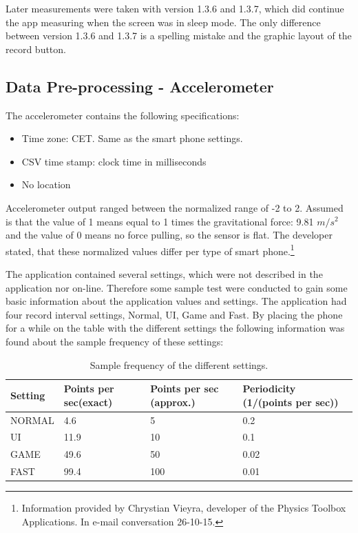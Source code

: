 Later measurements were taken with version 1.3.6 and 1.3.7, which did continue the app measuring when the screen was in sleep mode. The only difference between version 1.3.6 and 1.3.7 is a spelling mistake and the graphic layout of the record button.

\subsection{Data Pre-processing - Accelerometer}
The accelerometer contains the following specifications:
\begin{itemize}
\item Time zone: CET. Same as the smart phone settings. 
\item CSV time stamp: clock time in milliseconds
\item No location
\end{itemize}

Accelerometer output ranged between the normalized range of -2 to 2. Assumed is that the value of 1 means equal to 1 times the gravitational force: 9.81 $m/s^2$ and the value of 0 means no force pulling, so the sensor is flat. The developer stated, that these normalized values differ per type of smart phone.\footnote{Information provided by Chrystian Vieyra, developer of the Physics Toolbox Applications. In e-mail conversation 26-10-15. }

The application contained several settings, which were not described in the application nor on-line. Therefore some sample test were conducted to gain some basic information about the application values and settings. The application had four record interval settings, Normal, UI, Game and Fast. By placing the phone for a while on the table with the different settings the following information was found about the sample frequency of these settings: 

\renewcommand{\arraystretch}{1.5}
\renewcommand{\tabcolsep}{0.2cm}
\begin{table}[h]
\caption{Sample frequency of the different settings.}
\label{samfreq}
\centering
\begin{tabular}{|l|p{2cm}|p{2cm}|p{2.5cm}|} 
\hline 
 Setting & Points per sec(exact) & Points per sec (approx.) & Periodicity (1/(points per sec))\\
\hline
NORMAL & 4.6 & 5 &  0.2 \\
UI & 11.9 & 10 & 0.1 \\
GAME & 49.6 & 50 &  0.02 \\
FAST & 99.4 & 100 &  0.01 \\
\hline
\end{tabular}
\end{table}

